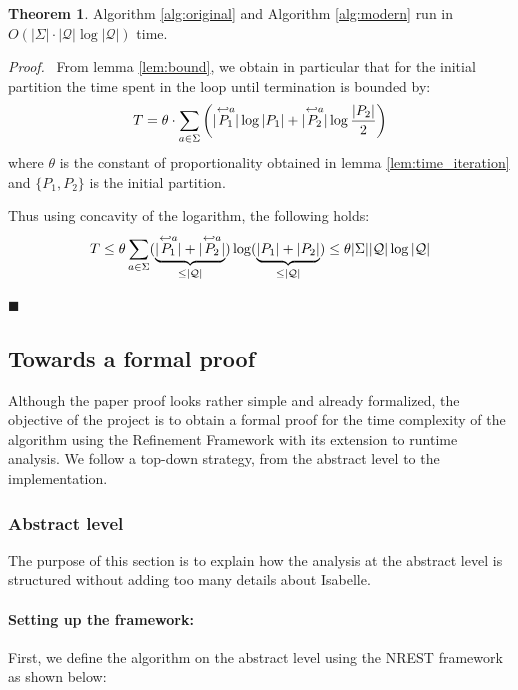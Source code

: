 \documentclass[12pt, a4 paper]{article}
\renewenvironment{proof}[1][Proof]{\begin{mdframed}[backgroundcolor=black!5, topline=false, rightline=false, bottomline=false, linecolor=black!15, linewidth=3pt]{\noindent\textit{#1.}\ }}{\noindent\par\hfill$\blacksquare$\end{mdframed}}
\theoremstyle{definition}
\newtheorem{theorem}{Theorem}
\begin{document}
\begin{mdframed}[middlelinewidth=1.5pt, middlelinecolor=red, roundcorner=2pt]
    \begin{theorem}
        \label{thm:complexity}
        Algorithm \ref{alg:original} and Algorithm \ref{alg:modern} run in $O\left(|\Sigma|\cdot|\mathcal{Q}| \log |\mathcal{Q}|\right)$ time.
    \end{theorem}
\end{mdframed}
\begin{proof}
From lemma \ref{lem:bound}, we obtain in particular that for the initial partition the time spent in the loop until termination is bounded by:
$$T = \theta \cdot \sum_{a \in \Sigma}\left(| \overset{\hookleftarrow {a}}{P_1} | \log | P_1 | + | \overset{\hookleftarrow {a}}{P_2} | \log \frac{| P_2 |}{2}\right)$$
where $\theta$ is the constant of proportionality obtained in lemma \ref{lem:time_iteration} and $\{P_1, P_2\}$ is the initial partition.

Thus using concavity of the logarithm, the following holds:
$$T \leq \theta \sum_{a \in \Sigma} (\underset{\leq |\mathcal{Q}|}{\underbrace{|\overset{\hookleftarrow {a}}{P_1}| + |\overset{\hookleftarrow {a}}{P_2}|}})\log(\underset{\leq |\mathcal{Q}|}{\underbrace{|P_1| + |P_2|}}) \leq \theta|\Sigma||\mathcal{Q}| \log |\mathcal{Q}|$$
\end{proof}

\subsection{Towards a formal proof \faGears}
Although the paper proof looks rather simple and already formalized, the objective of the project is to obtain a formal proof for the time complexity of the algorithm using the Refinement Framework with its extension to runtime analysis.
We follow a top-down strategy, from the abstract level to the implementation.

\subsubsection{Abstract level}

The purpose of this section is to explain how the analysis at the abstract level is structured without adding too many details about Isabelle.

\paragraph{Setting up the framework:}
First, we define the algorithm on the abstract level using the NREST framework as shown below:
\end{document}
